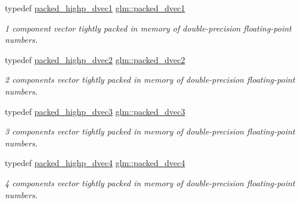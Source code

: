 \begin{DoxyCompactItemize}
typedef \hyperlink{group__gtc__type__aligned_ga28333ae58dc1ce6fdf75a8dba0065603}{packed\+\_\+highp\+\_\+dvec1} \hyperlink{group__gtc__type__aligned_ga1b85bcaa9f7caaec77f3a31d35669a98}{glm\+::packed\+\_\+dvec1}
\begin{DoxyCompactList}\small\item\em 1 component vector tightly packed in memory of double-\/precision floating-\/point numbers. \end{DoxyCompactList}\item 
\mbox{\label{group__gtc__type__aligned_ga88996e3df7350600759c8006ffcb7782}} 
typedef \hyperlink{group__gtc__type__aligned_ga8c26414d99b8996aa7dc73e1dc8a06bd}{packed\+\_\+highp\+\_\+dvec2} \hyperlink{group__gtc__type__aligned_ga88996e3df7350600759c8006ffcb7782}{glm\+::packed\+\_\+dvec2}
\begin{DoxyCompactList}\small\item\em 2 components vector tightly packed in memory of double-\/precision floating-\/point numbers. \end{DoxyCompactList}\item 
\mbox{\label{group__gtc__type__aligned_ga57dabe800889e40fa81a5a7a81cc25f0}} 
typedef \hyperlink{group__gtc__type__aligned_ga46950596525c0d1983113ead5f676651}{packed\+\_\+highp\+\_\+dvec3} \hyperlink{group__gtc__type__aligned_ga57dabe800889e40fa81a5a7a81cc25f0}{glm\+::packed\+\_\+dvec3}
\begin{DoxyCompactList}\small\item\em 3 components vector tightly packed in memory of double-\/precision floating-\/point numbers. \end{DoxyCompactList}\item 
\mbox{\label{group__gtc__type__aligned_ga858e69be626bfb48d644d8d6fe81b1a2}} 
typedef \hyperlink{group__gtc__type__aligned_ga7eb6a2440202876a3a223a1931dd496a}{packed\+\_\+highp\+\_\+dvec4} \hyperlink{group__gtc__type__aligned_ga858e69be626bfb48d644d8d6fe81b1a2}{glm\+::packed\+\_\+dvec4}
\begin{DoxyCompactList}\small\item\em 4 components vector tightly packed in memory of double-\/precision floating-\/point numbers. \end{DoxyCompactList}\item 
\mbox{\label{group__gtc__type__aligned_gafe9657c41fa58e912f99e92284d79fce}} 

\end{DoxyCompactItemize}
